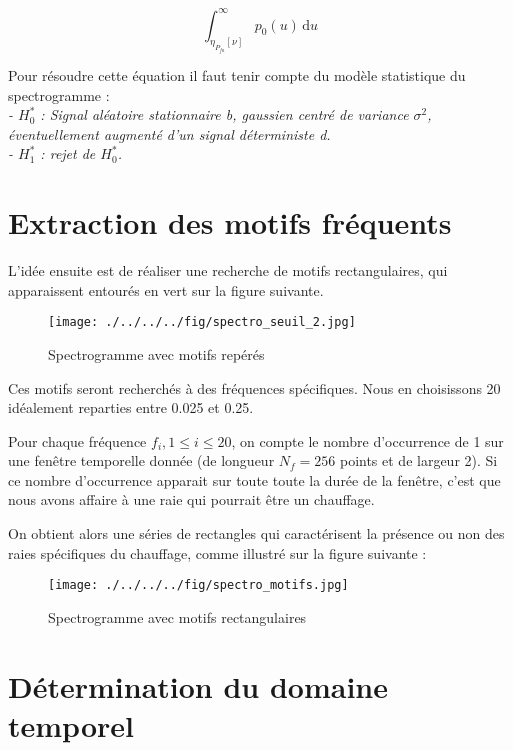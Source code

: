 \documentclass[10pt,a4paper]{article}
\begin{document}
\begin{equation}
\int_{\eta_{P_{fa}}[\nu]}^\infty p_0(u)\, \mathrm du
\label{moneq}
\end{equation}

Pour résoudre cette équation il faut tenir compte du modèle statistique du spectrogramme :\\
\textit{
- $H_0^*$ : Signal aléatoire stationnaire b, gaussien centré de variance $\sigma^2$, éventuellement augmenté d'un signal déterministe d.\\
- $H_1^*$ : rejet de $H_0^*$.}


\section{Extraction des motifs fréquents}
L'idée ensuite est de réaliser une recherche de motifs rectangulaires, qui apparaissent entourés en vert sur la figure suivante.

\begin{figure}[!h]
\begin{center}
\texttt{[image: ./../../../fig/spectro\_seuil\_2.jpg]}
\caption{Spectrogramme avec motifs repérés}
\label{Figure}
\end{center}
\end{figure}

\newpage

Ces motifs seront recherchés à des fréquences spécifiques. Nous en choisissons 20 idéalement reparties entre 0.025 et 0.25.

Pour chaque fréquence $f_i, 1\le i \le 20$, on compte le nombre d'occurrence de 1 sur une fenêtre temporelle donnée (de longueur $N_f = 256$ points et de largeur 2).
Si ce nombre d'occurrence apparait sur toute toute la durée de la fenêtre, c'est que nous avons affaire à une raie qui pourrait être un chauffage.

On obtient alors une séries de rectangles qui caractérisent la présence ou non des raies spécifiques du chauffage, comme illustré sur la figure suivante :

\begin{figure}[!h]
\begin{center}
\texttt{[image: ./../../../fig/spectro\_motifs.jpg]}
\caption{Spectrogramme avec motifs rectangulaires}
\label{Figure}
\end{center}
\end{figure}

\section{Détermination du domaine temporel}
\end{document}
